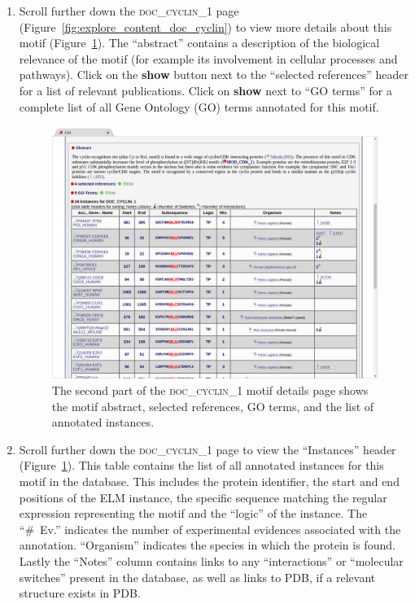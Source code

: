 \documentclass[12pt]{article}
\newcommand\button[1]{%
	\textbf{#1}%
}
\newcommand\motif[1]{%
    \textsc{\lowercase{#1}}%
}
\begin{document}
\begin{enumerate}
\item Scroll further down the \motif{DOC\_CYCLIN\_1} page
	(Figure~\ref{fig:explore_content_doc_cyclin}) to view
	more details about this motif
	(Figure~\ref{fig:explore_content_doc_cyclin_1_abstract_instances}).
    The ``abstract'' contains a description of the biological relevance of the
    motif (for example its involvement in cellular processes and pathways).
    Click on the \button{show} button next to the ``selected
	references'' header for a list of relevant publications.
	Click on \button{show} next to ``GO terms'' for a complete list of all
	Gene Ontology (GO) terms annotated for this motif.

\begin{figure}[h!]
	\centering
	\includegraphics[width=\textwidth]{Figures/5_doc_cyclin_1_abstract_instances.png}
	\caption{
		The second part of the \motif{DOC\_CYCLIN\_1} motif details page
		shows the motif abstract, selected references, GO terms, and the list of annotated
		instances.
	}
	\label{fig:explore_content_doc_cyclin_1_abstract_instances}
\end{figure}

\item Scroll further down the \motif{DOC\_CYCLIN\_1} page to view
	the ``Instances'' header
	(Figure~\ref{fig:explore_content_doc_cyclin_1_abstract_instances}).
	This table contains the list of all annotated
	instances for this motif in the database. This includes the protein
	identifier, the start and end positions of the ELM instance, the specific
	sequence matching the regular expression representing the motif and
	the ``logic'' of the instance.
	The ``\#~Ev.'' indicates the number of experimental evidences
	associated with the annotation. ``Organism'' indicates the
	species in which the protein is found. Lastly the ``Notes'' column
	contains links to any ``interactions'' or ``molecular switches'' present in the
	database, as well as links to PDB, if a relevant structure exists in PDB.
	

\end{enumerate}
\end{document}
